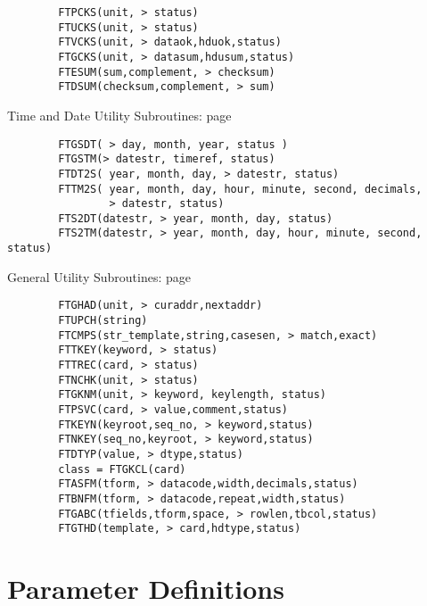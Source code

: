 \documentclass[11pt]{book}
\begin{document}
\begin{verbatim}
        FTPCKS(unit, > status)
        FTUCKS(unit, > status)
        FTVCKS(unit, > dataok,hduok,status)
        FTGCKS(unit, > datasum,hdusum,status)
        FTESUM(sum,complement, > checksum)
        FTDSUM(checksum,complement, > sum)

\end{verbatim}
 Time and Date Utility Subroutines: page~\pageref{FTGSDT}

\begin{verbatim}
        FTGSDT( > day, month, year, status )
        FTGSTM(> datestr, timeref, status)
        FTDT2S( year, month, day, > datestr, status)
        FTTM2S( year, month, day, hour, minute, second, decimals,
                > datestr, status)
        FTS2DT(datestr, > year, month, day, status)
        FTS2TM(datestr, > year, month, day, hour, minute, second, status)
\end{verbatim}
 General Utility Subroutines: page~\pageref{FTGHAD}

\begin{verbatim}
        FTGHAD(unit, > curaddr,nextaddr)
        FTUPCH(string)
        FTCMPS(str_template,string,casesen, > match,exact)
        FTTKEY(keyword, > status)
        FTTREC(card, > status)
        FTNCHK(unit, > status)
        FTGKNM(unit, > keyword, keylength, status)
        FTPSVC(card, > value,comment,status)
        FTKEYN(keyroot,seq_no, > keyword,status)
        FTNKEY(seq_no,keyroot, > keyword,status)
        FTDTYP(value, > dtype,status)
        class = FTGKCL(card)
        FTASFM(tform, > datacode,width,decimals,status)
        FTBNFM(tform, > datacode,repeat,width,status)
        FTGABC(tfields,tform,space, > rowlen,tbcol,status)
        FTGTHD(template, > card,hdtype,status)
\end{verbatim}

\chapter{ Parameter Definitions }
\end{document}
